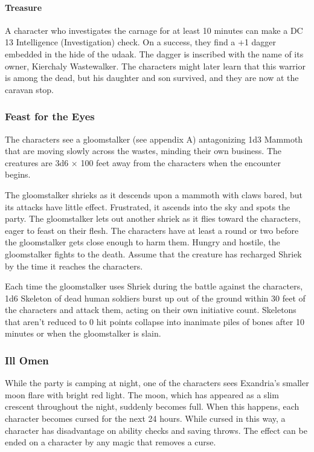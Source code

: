 \documentclass[10pt,a4paper,twoside,twocolumn,openany,nodeprecatedcode]{dndbook}
\begin{document}
\paragraph{Treasure}
A character who investigates the carnage for at least 10 minutes can make a DC 13 Intelligence (Investigation) check. On a success, they find a +1 dagger embedded in the hide of the udaak. The dagger is inscribed with the name of its owner, Kierchaly Wastewalker. The characters might later learn that this warrior is among the dead, but his daughter and son survived, and they are now at the caravan stop.

\subsubsection{Feast for the Eyes}
The characters see a gloomstalker (see appendix A) antagonizing 1d3 Mammoth that are moving slowly across the wastes, minding their own business. The creatures are 3d6 × 100 feet away from the characters when the encounter begins.

The gloomstalker shrieks as it descends upon a mammoth with claws bared, but its attacks have little effect. Frustrated, it ascends into the sky and spots the party. The gloomstalker lets out another shriek as it flies toward the characters, eager to feast on their flesh. The characters have at least a round or two before the gloomstalker gets close enough to harm them. Hungry and hostile, the gloomstalker fights to the death. Assume that the creature has recharged Shriek by the time it reaches the characters.

Each time the gloomstalker uses Shriek during the battle against the characters, 1d6 Skeleton of dead human soldiers burst up out of the ground within 30 feet of the characters and attack them, acting on their own initiative count. Skeletons that aren't reduced to 0 hit points collapse into inanimate piles of bones after 10 minutes or when the gloomstalker is slain.

\subsubsection{Ill Omen}
While the party is camping at night, one of the characters sees Exandria's smaller moon flare with bright red light. The moon, which has appeared as a slim crescent throughout the night, suddenly becomes full. When this happens, each character becomes cursed for the next 24 hours. While cursed in this way, a character has disadvantage on ability checks and saving throws. The effect can be ended on a character by any magic that removes a curse.
\end{document}

